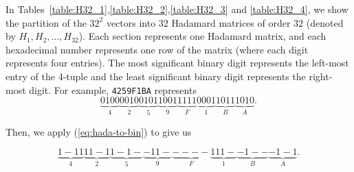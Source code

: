 In Tables~\ref{table:H32_1},\ref{table:H32_2},\ref{table:H32_3} and \ref{table:H32_4}, we show the partition of the $32^2$ vectors into $32$ Hadamard matrices of order $32$ (denoted by $H_1,H_2,\dots,H_{32}$). Each section represents one Hadamard matrix, and each hexadecimal number represents one row of the matrix (where each digit represents four entries). The most significant binary digit represents the left-most entry of the 4-tuple and the least significant binary digit represents the right-most digit. For example, \texttt{4259F1BA} represents $$\underbrace{0100}_{4}\underbrace{0010}_{2}\underbrace{0101}_{5}\underbrace{1001}_{9}\underbrace{1111}_{F}\underbrace{0001}_{1}\underbrace{1011}_{B}\underbrace{1010}_{A}.$$

Then, we apply (\ref{eq:hada-to-bin}) to give us

$$\underbrace{1-11}_{4}\underbrace{11-1}_{2}\underbrace{1-1-}_{5}\underbrace{-11-}_{9}\underbrace{----}_{F}\underbrace{111-}_{1}\underbrace{-1--}_{B}\underbrace{-1-1}_{A}.$$

\renewcommand{\arraystretch}{0.75}

